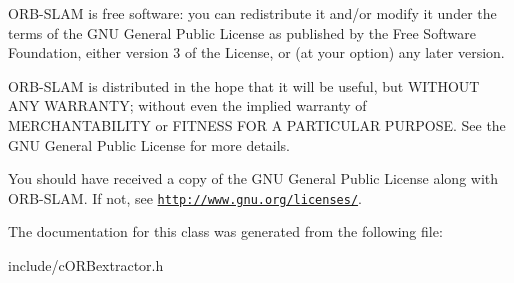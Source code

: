 O\+R\+B-\/\+S\+L\+AM is free software\+: you can redistribute it and/or modify it under the terms of the G\+NU General Public License as published by the Free Software Foundation, either version 3 of the License, or (at your option) any later version.

O\+R\+B-\/\+S\+L\+AM is distributed in the hope that it will be useful, but W\+I\+T\+H\+O\+UT A\+NY W\+A\+R\+R\+A\+N\+TY; without even the implied warranty of M\+E\+R\+C\+H\+A\+N\+T\+A\+B\+I\+L\+I\+TY or F\+I\+T\+N\+E\+SS F\+OR A P\+A\+R\+T\+I\+C\+U\+L\+AR P\+U\+R\+P\+O\+SE. See the G\+NU General Public License for more details.

You should have received a copy of the G\+NU General Public License along with O\+R\+B-\/\+S\+L\+AM. If not, see \href{http://www.gnu.org/licenses/}{\tt http\+://www.\+gnu.\+org/licenses/}. 

The documentation for this class was generated from the following file\+:\begin{DoxyCompactItemize}
\item 
include/c\+O\+R\+Bextractor.\+h\end{DoxyCompactItemize}
